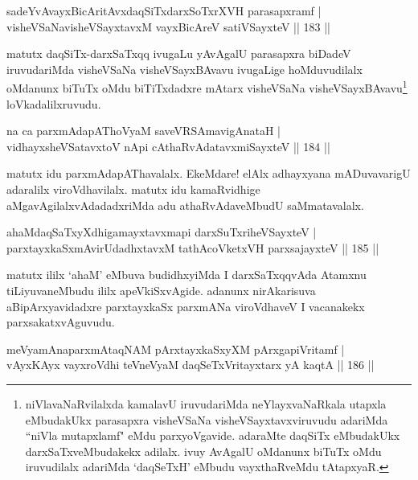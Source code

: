 
\begin{shl}
sadeYvAvayxBicAritAvxdaqSiTxdarxSoTxrXVH parasapxramf |\\
visheVSaNavisheVSayxtavxM vayxBicAreV satiVSayxteV \hfill || 183 ||
\end{shl}

\begin{artha}
matutx daqSiTx-darxSaTxqq ivugaLu yAvAgalU parasapxra biDadeV iruvudariMda visheVSaNa visheVSayxBAvavu ivugaLige hoMduvudilalx oMdanunx biTuTx oMdu biTiTxdadxre mAtarx visheVSaNa visheVSayxBAvavu\footnote[1]{niVlavaNaRvilalxda kamalavU iruvudariMda neYlayxvaNaRkala utapxla eMbudakUkx parasapxra visheVSaNa visheVSayxtavxviruvudu adariMda ``niVla mutapxlamf" eMdu parxyoVgavide. adaraMte daqSiTx eMbudakUkx darxSaTxveMbudakekx adilalx. ivuy AvAgalU oMdanunx biTuTx oMdu iruvudilalx adariMda `daqSeTxH' eMbudu vayxthaRveMdu tAtapxyaR.} loVkadalilxruvudu.
\end{artha}

\begin{shl}
na ca parxmAdapAThoV\s yaM saveVRSAmavigAnataH |\\
vidhayxsheVSatavxtoV nApi cAthaRvAdatavxmiSayxteV \hfill || 184 ||
\end{shl}	

\begin{artha}
matutx idu parxmAdapAThavalalx. EkeMdare! elAlx adhayxyana mADuvavarigU adaralilx viroVdhavilalx. matutx idu kamaRvidhige aMgavAgilalxvAdadadxriMda adu athaRvAdaveMbudU saMmatavalalx.
\end{artha}


\begin{shl}
ahaMdaqSaTxyXdhigamayxtavxmapi darxSuTxriheVSayxteV |\\
parxtayxkaSxmAvirUdadhxtavxM tathAcoVketxVH parxsajayxteV \hfill || 185 ||
\end{shl}

\begin{artha}
matutx ililx `ahaM' eMbuva budidhxyiMda I darxSaTxqqvAda Atamxnu tiLiyuvaneMbudu ililx apeVkiSxvAgide. adanunx nirAkarisuva aBipArxyavidadxre parxtayxkaSx parxmANa viroVdhaveV I vacanakekx parxsakatxvAguvudu.
\end{artha}

\begin{shl}
meVyamAnaparxmAtaqNAM pArxtayxkaSxyXM pArxgapiVritamf |\\
vAyxKAyx vayxroVdhi teVneVyaM daqSeTxVritayxtarx yA kaqtA \hfill || 186 ||
\end{shl}

